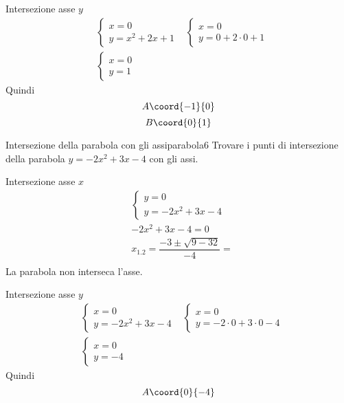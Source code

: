 Intersezione asse $y$
\begin{align*}
	&\begin{cases}
		x=0\\y=x^2+2x+1
	\end{cases}&\begin{cases}
	x=0\\y=0+2\cdot 0+1
\end{cases}\\&\begin{cases}
x=0\\y=1
\end{cases}
\end{align*}
Quindi \[A\coord{-1}{0} \]  \[B\coord{0}{1} \]
\begin{center}
	
	\label{fig:disegnoparabola5}
\end{center}
\begin{esempiot}{Intersezione della parabola con gli assi}{parabola6}
	Trovare i punti di intersezione della parabola $y=-2x^2+3x-4$ con gli assi.
\end{esempiot}
Intersezione asse $x$
\begin{align*}
	&\begin{cases}
		y=0\\y=-2x^2+3x-4
	\end{cases}\\
	&-2x^2+3x-4=0\\
	&x_{1.2}=\dfrac{-3\pm\sqrt{9-32}}{-4}=\\
\end{align*}
La parabola non interseca l'asse.\par
Intersezione asse $y$
\begin{align*}
	&\begin{cases}
		x=0\\y=-2x^2+3x-4
	\end{cases}&\begin{cases}
	x=0\\y=-2\cdot 0+3\cdot 0-4
\end{cases}\\&\begin{cases}
x=0\\y=-4
\end{cases}
\end{align*}
Quindi \[A\coord{0}{-4} \] 
\begin{center}
	
	\label{fig:disegnoparabola6}
\end{center}
